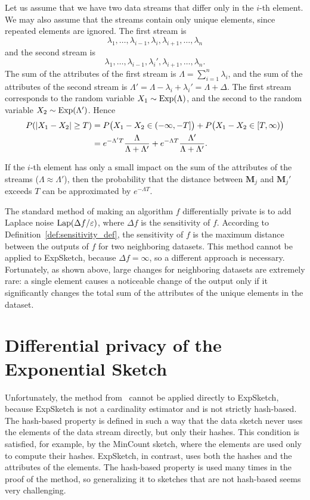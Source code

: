 Let us assume that we have two data streams that differ only in the $i$-th element. We may also assume that the streams contain only unique elements, since repeated elements are ignored. The first stream is
\[
\lambda_1, \ldots, \lambda_{i-1}, \lambda_{i}, \lambda_{i+1}, \ldots, \lambda_{n}
\]
and the second stream is
\[
\lambda_1, \ldots, \lambda_{i-1}, \lambda_{i}', \lambda_{i+1}, \ldots, \lambda_{n}.
\]
The sum of the attributes of the first stream is $\Lambda = \sum_{i=1}^{n} \lambda_i$, and the sum of the attributes of the second stream is $\Lambda' = \Lambda - \lambda_{i} + \lambda_{i}' = \Lambda + \Delta$. The first stream corresponds to the random variable $X_1 \sim \operatorname{Exp}(\Lambda)$, and the second to the random variable $X_2 \sim \operatorname{Exp}(\Lambda')$. Hence
\begin{align*}
P(\lvert X_1 - X_2\rvert \geq T) &= P\bigl(X_1 - X_2 \in (-\infty, -T]\bigr) + P\bigl(X_1 - X_2 \in [T, \infty)\bigr) \\
  &= e^{-\Lambda' T}\frac{\Lambda}{\Lambda + \Lambda'} + e^{-\Lambda T} \frac{\Lambda'}{\Lambda + \Lambda'}.
\end{align*}

If the $i$-th element has only a small impact on the sum of the attributes of the streams ($\Lambda \approx \Lambda'$), then the probability that the distance between $\mathbf{M}_j$ and $\mathbf{M}_j'$ exceeds $T$ can be approximated by $e^{-\Lambda T}$.

The standard method of making an algorithm $f$ differentially private is to add Laplace noise $\operatorname{Lap}(\Delta f / \varepsilon)$, where $\Delta f$ is the sensitivity of $f$. According to Definition~\ref{def:sensitivity_def}, the sensitivity of $f$ is the maximum distance between the outputs of $f$ for two neighboring datasets. This method cannot be applied to ExpSketch, because $\Delta f = \infty$, so a different approach is necessary. Fortunately, as shown above, large changes for neighboring datasets are extremely rare: a single element causes a noticeable change of the output only if it significantly changes the total sum of the attributes of the unique elements in the dataset.

\section{Differential privacy of the Exponential Sketch}

Unfortunately, the method from~\cite{Order_Invariant_Cardinality_Estimators_Are_Differentially_Private} cannot be applied directly to ExpSketch, because ExpSketch is not a cardinality estimator and is not strictly hash-based. The hash-based property is defined in such a way that the data sketch never uses the elements of the data stream directly, but only their hashes. This condition is satisfied, for example, by the MinCount sketch, where the elements are used only to compute their hashes. ExpSketch, in contrast, uses both the hashes and the attributes of the elements. The hash-based property is used many times in the proof of the method, so generalizing it to sketches that are not hash-based seems very challenging.

